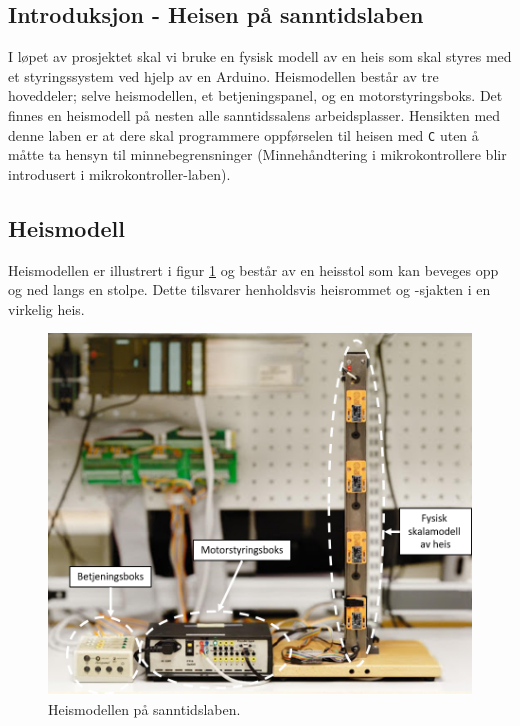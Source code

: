 \begin{alphasection}
\clearpage

\section{Introduksjon - Heisen på sanntidslaben}\label{sec:2-innføringheis}

I løpet av prosjektet skal vi bruke en fysisk modell av en heis som skal styres med et styringssystem ved hjelp av en Arduino. Heismodellen består av tre hoveddeler; selve heismodellen, et betjeningspanel, og en motorstyringsboks. Det finnes en heismodell på nesten alle sanntidssalens arbeidsplasser. Hensikten med denne laben er at dere skal programmere oppførselen til heisen med \verb|C| uten å måtte ta hensyn til minnebegrensninger (Minnehåndtering i mikrokontrollere blir introdusert i mikrokontroller-laben).



\subsection{Heismodell}
Heismodellen er illustrert i figur \ref{fig:heis-modell-sal} og består av en heisstol som kan beveges opp og ned langs en stolpe. Dette tilsvarer henholdsvis heisrommet og -sjakten i en virkelig heis.

\begin{figure}[ht]
    \centering
    \includegraphics[scale=.85]{figures/HEIS.png}
    \caption{Heismodellen på sanntidslaben.}
    \label{fig:heis-modell-sal}
\end{figure}


\end{alphasection}
